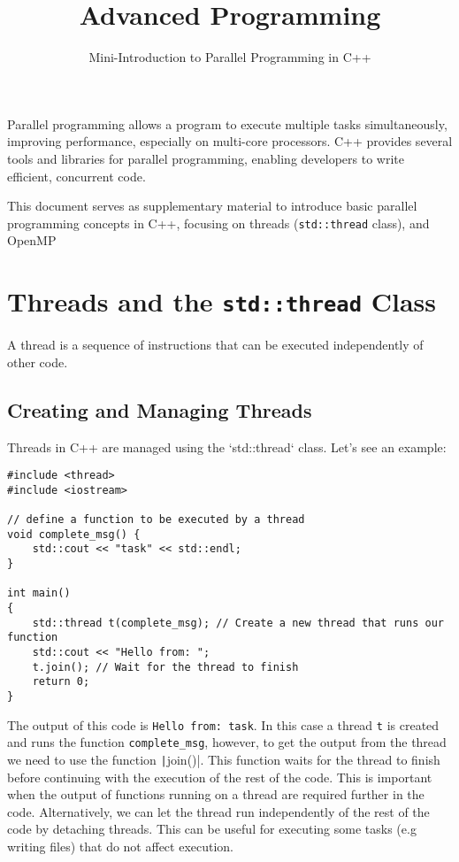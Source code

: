 \documentclass{article}
\title{Advanced Programming}
\author{Mini-Introduction to Parallel Programming in C++}
\date{}
\begin{document}
\maketitle

Parallel programming allows a program to execute multiple tasks simultaneously, improving performance, especially on multi-core processors. C++ provides several tools and libraries for parallel programming, enabling developers to write efficient, concurrent code.

This document serves as supplementary material to introduce basic parallel programming concepts in C++, focusing on threads (\texttt{std::thread} class), and OpenMP

\section{Threads and the \texttt{std::thread} Class}
A thread is a sequence of instructions that can be executed independently of other code.

\subsection{Creating and Managing Threads}
Threads in C++ are managed using the `std::thread` class. Let's see an example:

\begin{verbatim}
#include <thread>
#include <iostream>

// define a function to be executed by a thread
void complete_msg() {
   	std::cout << "task" << std::endl;
}

int main()
{
    std::thread t(complete_msg); // Create a new thread that runs our function
    std::cout << "Hello from: ";
    t.join(); // Wait for the thread to finish
    return 0;
}
\end{verbatim}

The output of this code is \verb|Hello from: task|. In this case a thread \verb|t| is created and runs the function \verb|complete_msg|, however, to get the output from the thread we need to use the function \texttt|join()|. This function waits for the thread to finish before continuing with the execution of the rest of the code. This is important when the output of functions running on a thread are required further in the code.
Alternatively, we can let the thread run independently of the rest of the code by detaching threads. This can be useful for executing some tasks (e.g writing files) that do not affect execution.
\end{document}
